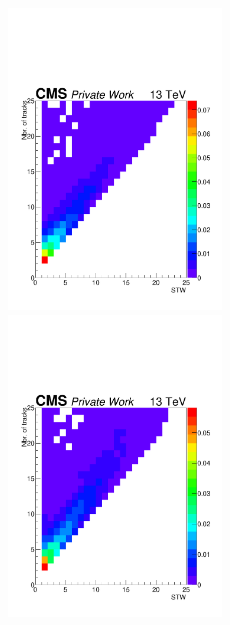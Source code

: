 \documentclass{cernatlasnote}
\begin{document}
\begin{appendices}
\begin{figure}[ht]
\includegraphics[height=8cm, width=9cm, trim= 0cm 0cm 0cm 0cm,clip]{images/VTXBDT/STW_Ntrks_400_300_100.pdf}\includegraphics[height=8cm, width=9cm, trim= 0cm 0cm 0cm 0cm,clip]{images/VTXBDT/STW_Ntrks_500_350_100.pdf}

\end{figure}
\end{appendices}
\end{document}
